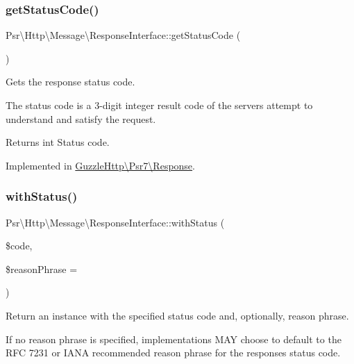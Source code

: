\subsubsection{\texorpdfstring{get\+Status\+Code()}{getStatusCode()}}
{\footnotesize\ttfamily Psr\textbackslash{}\+Http\textbackslash{}\+Message\textbackslash{}\+Response\+Interface\+::get\+Status\+Code (\begin{DoxyParamCaption}{ }\end{DoxyParamCaption})}

Gets the response status code.

The status code is a 3-\/digit integer result code of the server\textquotesingle{}s attempt to understand and satisfy the request.

\begin{DoxyReturn}{Returns}
int Status code. 
\end{DoxyReturn}


Implemented in \hyperlink{classGuzzleHttp_1_1Psr7_1_1Response_af62648e0dfc88b9100d82c188337882a}{Guzzle\+Http\textbackslash{}\+Psr7\textbackslash{}\+Response}.

\mbox{\label{interfacePsr_1_1Http_1_1Message_1_1ResponseInterface_ae79c87a0cd82e000a5e1bb4dbee739da}} 
\subsubsection{\texorpdfstring{with\+Status()}{withStatus()}}
{\footnotesize\ttfamily Psr\textbackslash{}\+Http\textbackslash{}\+Message\textbackslash{}\+Response\+Interface\+::with\+Status (\begin{DoxyParamCaption}\item[{}]{\$code,  }\item[{}]{\$reason\+Phrase = {\ttfamily \textquotesingle{}\textquotesingle{}} }\end{DoxyParamCaption})}

Return an instance with the specified status code and, optionally, reason phrase.

If no reason phrase is specified, implementations M\+AY choose to default to the R\+FC 7231 or I\+A\+NA recommended reason phrase for the response\textquotesingle{}s status code.

